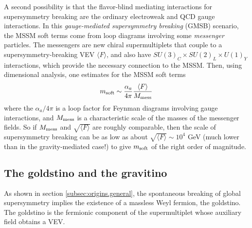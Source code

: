 \documentclass[11pt]{article}
\def\beq{\begin{eqnarray}}
\def\eeq{\end{eqnarray}}
\begin{document}
A second possibility is that the flavor-blind mediating interactions for
supersymmetry breaking are the ordinary electroweak and QCD gauge
interactions. In this {\it gauge-mediated supersymmetry breaking} (GMSB)
scenario, the MSSM soft terms come from loop diagrams involving some {\it
messenger} particles.  The messengers are new chiral supermultiplets that
couple to a supersymmetry-breaking VEV $\langle F\rangle$, and also have
$SU(3)_C \times SU(2)_L \times U(1)_Y$ interactions, which provide the
necessary connection to the MSSM. Then, using dimensional analysis, one 
estimates for the MSSM soft terms
\beq
m_{\rm soft} \sim {\alpha_a\over 4\pi} {\langle F \rangle
\over M_{\rm mess}}
\label{mgravgmsb}
\eeq
where the $\alpha_a/4\pi$ is a loop factor for Feynman diagrams involving
gauge interactions, and $M_{\rm mess}$ is a characteristic scale of the
masses of the messenger fields. So if $M_{\rm mess}$ and $\sqrt{\langle
F\rangle}$ are roughly comparable, then the scale of supersymmetry
breaking can be as low as about ${\sqrt{\langle F\rangle}} \sim 10^4$ GeV
(much lower than in the gravity-mediated case!) to give $m_{\rm soft}$ of
the right order of magnitude.

\subsection{The goldstino and the gravitino}\label{subsec:origins.gravitino}
\setcounter{equation}{0}
\setcounter{footnote}{1}

As shown in section \ref{subsec:origins.general}, the spontaneous breaking
of global supersymmetry implies the existence of a massless Weyl fermion,
the goldstino.  The goldstino is the fermionic component of the
supermultiplet whose auxiliary field obtains a VEV.
\end{document}
